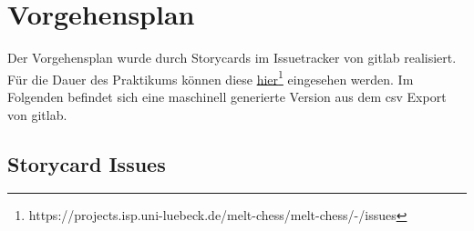 \chapter{Vorgehensplan}
Der Vorgehensplan wurde durch Storycards im Issuetracker von gitlab realisiert. Für die Dauer des Praktikums können diese \href{https://projects.isp.uni-luebeck.de/melt-chess/melt-chess/-/issues}{hier}\footnote{https://projects.isp.uni-luebeck.de/melt-chess/melt-chess/-/issues} eingesehen werden. Im Folgenden befindet sich eine maschinell generierte Version aus dem csv Export von gitlab.

\section{Storycard Issues}

